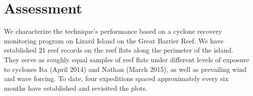 \section{Assessment}

We characterize the technique's performance based on a cyclone recovery monitoring program on Lizard Island on the Great Barrier Reef. We have established 21 reef records on the reef flats along the perimeter of the island. They serve as roughly equal samples of reef flats under different levels of exposure to cyclones Ita (April 2014) and Nathan (March 2015), as well as prevailing wind and wave forcing. To date, four expeditions spaced approximately every six months have established and revisited the plots.

